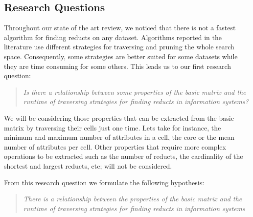 \documentclass[authoryear,11pt]{elsarticle}
\begin{document}
\subsection{Research Questions}\label{ResearchQuestions} 
  Throughout our state of the art review, we noticed that there is not a fastest algorithm for finding reducts 
  on any dataset. Algorithms reported in the literature use different strategies for traversing and pruning 
  the whole search space. Consequently, some strategies are better suited for some datasets while they are time
  consuming for some others. This leads us to our first research question:
  
\begin{quote}
  \emph{Is there a relationship between some properties of the basic matrix and the runtime 
  		of traversing strategies for finding reducts in information systems?}
\end{quote}
  		
  We will be considering those properties that can be extracted from the basic matrix by traversing their 
  cells just one time. Lets take for instance, the minimum and maximum number of attributes in a cell, the 
  core or the mean number of attributes per cell. Other properties that require more complex operations to 
  be extracted such as the number of reducts, the cardinality of the shortest and largest reducts, etc; 
  will not be considered.
  
  From this research question we formulate the following hypothesis:
  
\begin{quote}  
  \emph{There is a relationship between the properties of the basic matrix and the runtime 
  		of traversing strategies for finding reducts in information systems}
\end{quote}
  		
%  
%
%    
  
\end{document}
